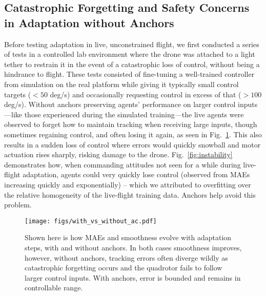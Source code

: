 \documentclass[letterpaper, 10 pt, conference]{ieeeconf} %
\begin{document}



    \subsection{Catastrophic Forgetting and Safety Concerns in Adaptation without Anchors}\label{subsec:forgettingAndUnsafe}
        
        Before testing adaptation in live, unconstrained flight, we first conducted a series of tests in a controlled lab environment where the drone was attached to a light tether to restrain it in the event of a catastrophic loss of control, without being a hindrance to flight.
        These tests consisted of fine-tuning a well-trained controller from simulation on the real platform while giving it typically small control targets ($< 50$ deg/s) and occasionally requesting control in excess of that ($> 100$ deg/s).
        Without anchors preserving agents' performance on larger control inputs---like those experienced during the simulated training---the live agents were observed to forget how to maintain tracking when receiving large inputs, though sometimes regaining control, and often losing it again, as seen in Fig.~\ref{fig:ac_vs_no_ac}.
        This also results in a sudden loss of control where errors would quickly snowball and motor actuation rises sharply, risking damage to the drone.
        Fig.~\ref{fig:instability} demonstrates how, when commanding attitudes not seen for a while during live-flight adaptation, agents could very quickly lose control (observed from MAEs increasing quickly and exponentially) -- which we attributed to overfitting over the relative homogeneity of the live-flight training data.
        Anchors help avoid this problem.
        
        \begin{figure}[t]
            \centering
            \texttt{[image: figs/with\_vs\_without\_ac.pdf]}
            \caption{
                Shown here is how MAEs and smoothness evolve with adaptation steps, with and without anchors. 
                In both cases smoothness improves, however, without anchors, tracking errors often diverge wildly as catastrophic forgetting occurs and the quadrotor fails to follow larger control inputs. 
                With anchors, error is bounded and remains in controllable range.
            }
            \label{fig:ac_vs_no_ac}
            \vspace{-.5\baselineskip}
        \end{figure}
        
\end{document}
